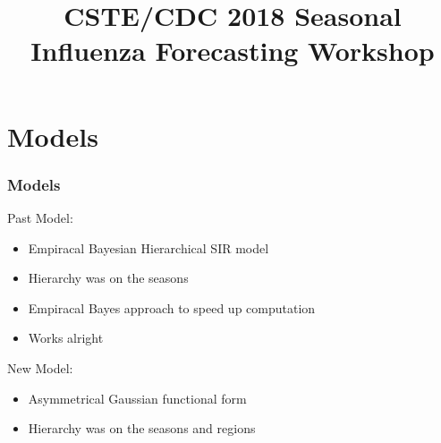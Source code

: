 \documentclass{beamer}\usepackage[]{graphicx}\usepackage[]{color}
\title{CSTE/CDC 2018 Seasonal Influenza Forecasting Workshop}
\begin{document}
\begin{frame}
\maketitle
\end{frame}





\section{Models}
\begin{frame}
\frametitle{Models}

Past Model:
\begin{itemize}
\item Empiracal Bayesian Hierarchical SIR model
\item Hierarchy was on the seasons
\item Empiracal Bayes approach to speed up computation
\item Works alright \\
\end{itemize}

\vspace{5mm}

\pause
New Model:
\begin{itemize}
\item Asymmetrical Gaussian functional form
\item Hierarchy was on the seasons and regions
\end{itemize}

\end{frame}




\end{document}
